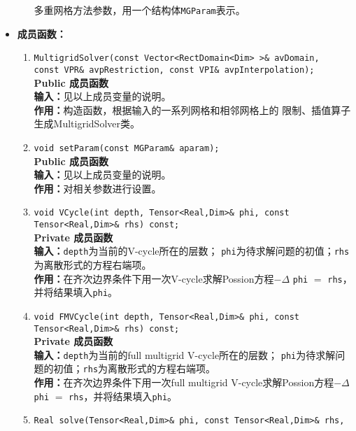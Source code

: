 \documentclass[a4paper,twoside]{ctexart}
\begin{document}
\begin{itemize}
\begin{enumerate}[(1)]
          多重网格方法参数，用一个结构体\texttt{MGParam}表示。
        \end{enumerate}
      \item \textbf{成员函数：}
        \begin{enumerate}[(1)]
        \item \texttt{MultigridSolver(const Vector<RectDomain<Dim> >\& avDomain,\\ const VPR\&
            avpRestriction, const VPI\& avpInterpolation);}\\
          \textbf{Public 成员函数}\\
          \textbf{输入：}见以上成员变量的说明。\\
          \textbf{作用：}构造函数，根据输入的一系列网格和相邻网格上的
          限制、插值算子生成MultigridSolver类。
          \item \texttt{void setParam(const MGParam\& aparam);}\\
          \textbf{Public 成员函数}\\
          \textbf{输入：}见以上成员变量的说明。\\
          \textbf{作用：}对相关参数进行设置。
          \item \texttt{void VCycle(int depth, Tensor<Real,Dim>\& phi, const Tensor<Real,Dim>\&
              rhs) const;}\\
          \textbf{Private 成员函数}\\
          \textbf{输入：}\texttt{depth}为当前的V-cycle所在的层数；
          \texttt{phi}为待求解问题的初值；\texttt{rhs}为离散形式的方程右端项。\\
          \textbf{作用：}在齐次边界条件下用一次V-cycle求解Possion方程$-\Delta$ \texttt{phi} $=$
          \texttt{rhs}，并将结果填入\texttt{phi}。
          \item \texttt{void FMVCycle(int depth, Tensor<Real,Dim>\& phi, const Tensor<Real,Dim>\&
               rhs) const;}\\
          \textbf{Private 成员函数}\\
          \textbf{输入：}\texttt{depth}为当前的full multigrid V-cycle所在的层数；
          \texttt{phi}为待求解问题的初值；\texttt{rhs}为离散形式的方程右端项。\\
          \textbf{作用：}在齐次边界条件下用一次full multigrid V-cycle求解Possion方程$-\Delta$ \texttt{phi} $=$
          \texttt{rhs}，并将结果填入\texttt{phi}。
        \item \texttt{Real solve(Tensor<Real,Dim>\& phi, const Tensor<Real,Dim>\& rhs,\\
}
\end{enumerate}
\end{itemize}
\end{document}
